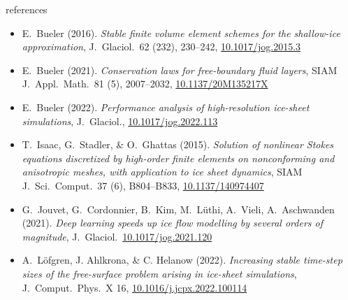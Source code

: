 \documentclass[svgnames,
               hyperref={colorlinks,citecolor=DeepPink4,linkcolor=FireBrick,urlcolor=Maroon},
               usepdftitle=false]  %
               {beamer}
\begin{document}
\begin{frame}{references}

\begin{itemize}
\footnotesize
\item E.~Bueler (2016). \emph{Stable finite volume element schemes for the shallow-ice approximation}, J.~Glaciol.~62 (232), 230--242, \href{https://doi.org/10.1017/jog.2015.3}{10.1017/jog.2015.3}
\item E.~Bueler (2021). \emph{Conservation laws for free-boundary fluid layers}, SIAM J.~Appl.~Math.~81 (5), 2007--2032, \href{https://doi.org/10.1137/20M135217X}{10.1137/20M135217X}
\item E.~Bueler (2022). \emph{Performance analysis of high-resolution ice-sheet simulations}, J.~Glaciol., \href{https://doi.org/10.1017/jog.2022.113}{10.1017/jog.2022.113}
\item T.~Isaac, G.~Stadler, \& O.~Ghattas (2015). \emph{Solution of nonlinear Stokes equations discretized by high-order finite elements on nonconforming and anisotropic meshes, with application to ice sheet dynamics}, SIAM J.~Sci.~Comput.~37 (6), B804--B833, \href{https://doi.org/10.1137/140974407}{10.1137/140974407}
\item G.~Jouvet, G.~Cordonnier, B.~Kim, M.~L\"uthi, A.~Vieli, A.~Aschwanden (2021). \emph{Deep learning speeds up ice flow modelling by several orders of magnitude}, J.~Glaciol.~\href{https://doi.org/10.1017/jog.2021.120}{10.1017/jog.2021.120}
\item A.~L{\"o}fgren, J. Ahlkrona, \& C. Helanow (2022). \emph{Increasing stable time-step sizes of the free-surface problem arising in ice-sheet simulations}, J.~Comput.~Phys.~X 16, \href{https://doi.org/10.1016/j.jcpx.2022.100114}{10.1016/j.jcpx.2022.100114}
\end{itemize}
\end{frame}
\end{document}
